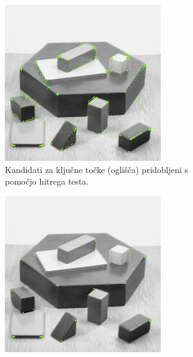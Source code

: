 \documentclass[a4paper,11pt]{article}
\begin{document}
\begin{figure}[hb]
	\centering
	\begin{subfigure}[t]{0.48\textwidth}
		\centering
		\includegraphics[width=\textwidth]{images/blox_corners_high-speed.jpg}
		\caption{Kandidati za ključne točke (oglišča) pridobljeni s pomočjo hitrega testa.}
		\label{img:kp_high_speed}
	\end{subfigure}
	\hfill
	\begin{subfigure}[t]{0.48\textwidth}
		\centering
		\includegraphics[width=\textwidth]{images/blox_corners_all.jpg}

\end{subfigure}
\end{figure}
\end{document}
